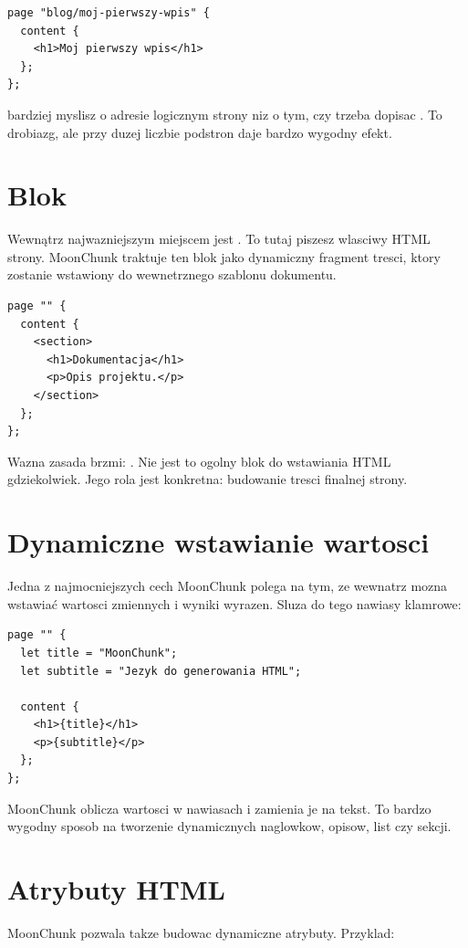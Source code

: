 \begin{lstlisting}[style=moonchunk,caption={Trasa w stylu logicznym}]
page "blog/moj-pierwszy-wpis" {
  content {
    <h1>Moj pierwszy wpis</h1>
  };
};
\end{lstlisting}

bardziej myslisz o adresie logicznym strony niz o tym, czy trzeba dopisac .
To drobiazg, ale przy duzej liczbie podstron daje bardzo wygodny efekt.

\section{Blok }
Wewnątrz  najwazniejszym miejscem jest . To tutaj piszesz wlasciwy
HTML strony. MoonChunk traktuje ten blok jako dynamiczny fragment tresci, ktory zostanie
wstawiony do wewnetrznego szablonu dokumentu.

\begin{lstlisting}[style=moonchunk,caption={Zawartosc strony w bloku content}]
page "" {
  content {
    <section>
      <h1>Dokumentacja</h1>
      <p>Opis projektu.</p>
    </section>
  };
};
\end{lstlisting}

Wazna zasada brzmi: .
Nie jest to ogolny blok do wstawiania HTML gdziekolwiek. Jego rola jest konkretna:
budowanie tresci finalnej strony.

\section{Dynamiczne wstawianie wartosci}
Jedna z najmocniejszych cech MoonChunk polega na tym, ze wewnatrz  mozna
wstawiać wartosci zmiennych i wyniki wyrazen. Sluza do tego nawiasy klamrowe:

\begin{lstlisting}[style=moonchunk,caption={Interpolacja wartosci w HTML}]
page "" {
  let title = "MoonChunk";
  let subtitle = "Jezyk do generowania HTML";

  content {
    <h1>{title}</h1>
    <p>{subtitle}</p>
  };
};
\end{lstlisting}

MoonChunk oblicza wartosci w nawiasach i zamienia je na tekst. To bardzo wygodny sposob
na tworzenie dynamicznych naglowkow, opisow, list czy sekcji.

\section{Atrybuty HTML}
MoonChunk pozwala takze budowac dynamiczne atrybuty. Przyklad:

